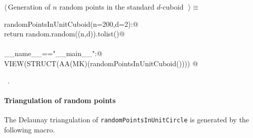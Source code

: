 \documentclass[11pt,oneside]{article}	%
\begin{document}
\begin{flushleft} \small \label{scrap20}
$\langle\,$Generation of $n$ random points in the standard $d$-cuboid\nobreak\ {\footnotesize {}}$\,\rangle\equiv$
\vspace{-1ex}
\begin{list}{}{} \item
\mbox{}\verb@def randomPointsInUnitCuboid(n=200,d=2):@\\
\mbox{}\verb@   return random.random((n,d)).tolist()@\\
\mbox{}\verb@@\\
\mbox{}\verb@if __name__=="__main__":@\\
\mbox{}\verb@   VIEW(STRUCT(AA(MK)(randomPointsInUnitCuboid()))) @\\
\mbox{}\verb@@{\NWsep}
\end{list}
\vspace{-1ex}
\footnotesize\addtolength{\baselineskip}{-1ex}
\begin{list}{}{\setlength{\itemsep}{-\parsep}\setlength{\itemindent}{-\leftmargin}}
\item \NWtxtMacroRefIn\ .
\end{list}
\end{flushleft}



\paragraph{Triangulation of random points} The Delaunay triangulation of \texttt{randomPointsInUnitCircle} is generated by the following macro.
\end{document}
